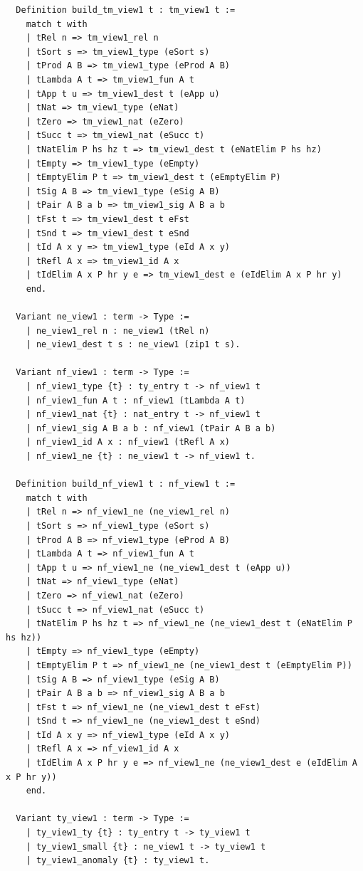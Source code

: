 \documentclass[10pt,a4paper]{amsart}
\begin{document}
\begin{lstlisting}
  Definition build_tm_view1 t : tm_view1 t :=
    match t with
    | tRel n => tm_view1_rel n
    | tSort s => tm_view1_type (eSort s)
    | tProd A B => tm_view1_type (eProd A B)
    | tLambda A t => tm_view1_fun A t
    | tApp t u => tm_view1_dest t (eApp u)
    | tNat => tm_view1_type (eNat)
    | tZero => tm_view1_nat (eZero)
    | tSucc t => tm_view1_nat (eSucc t)
    | tNatElim P hs hz t => tm_view1_dest t (eNatElim P hs hz)
    | tEmpty => tm_view1_type (eEmpty)
    | tEmptyElim P t => tm_view1_dest t (eEmptyElim P)
    | tSig A B => tm_view1_type (eSig A B)
    | tPair A B a b => tm_view1_sig A B a b
    | tFst t => tm_view1_dest t eFst
    | tSnd t => tm_view1_dest t eSnd
    | tId A x y => tm_view1_type (eId A x y)
    | tRefl A x => tm_view1_id A x
    | tIdElim A x P hr y e => tm_view1_dest e (eIdElim A x P hr y)
    end.

  Variant ne_view1 : term -> Type :=
    | ne_view1_rel n : ne_view1 (tRel n)
    | ne_view1_dest t s : ne_view1 (zip1 t s).

  Variant nf_view1 : term -> Type :=
    | nf_view1_type {t} : ty_entry t -> nf_view1 t
    | nf_view1_fun A t : nf_view1 (tLambda A t)
    | nf_view1_nat {t} : nat_entry t -> nf_view1 t
    | nf_view1_sig A B a b : nf_view1 (tPair A B a b)
    | nf_view1_id A x : nf_view1 (tRefl A x)
    | nf_view1_ne {t} : ne_view1 t -> nf_view1 t.

  Definition build_nf_view1 t : nf_view1 t :=
    match t with
    | tRel n => nf_view1_ne (ne_view1_rel n)
    | tSort s => nf_view1_type (eSort s)
    | tProd A B => nf_view1_type (eProd A B)
    | tLambda A t => nf_view1_fun A t
    | tApp t u => nf_view1_ne (ne_view1_dest t (eApp u))
    | tNat => nf_view1_type (eNat)
    | tZero => nf_view1_nat (eZero)
    | tSucc t => nf_view1_nat (eSucc t)
    | tNatElim P hs hz t => nf_view1_ne (ne_view1_dest t (eNatElim P hs hz))
    | tEmpty => nf_view1_type (eEmpty)
    | tEmptyElim P t => nf_view1_ne (ne_view1_dest t (eEmptyElim P))
    | tSig A B => nf_view1_type (eSig A B)
    | tPair A B a b => nf_view1_sig A B a b
    | tFst t => nf_view1_ne (ne_view1_dest t eFst)
    | tSnd t => nf_view1_ne (ne_view1_dest t eSnd)
    | tId A x y => nf_view1_type (eId A x y)
    | tRefl A x => nf_view1_id A x
    | tIdElim A x P hr y e => nf_view1_ne (ne_view1_dest e (eIdElim A x P hr y))
    end.

  Variant ty_view1 : term -> Type :=
    | ty_view1_ty {t} : ty_entry t -> ty_view1 t
    | ty_view1_small {t} : ne_view1 t -> ty_view1 t
    | ty_view1_anomaly {t} : ty_view1 t.


\end{lstlisting}
\end{document}
